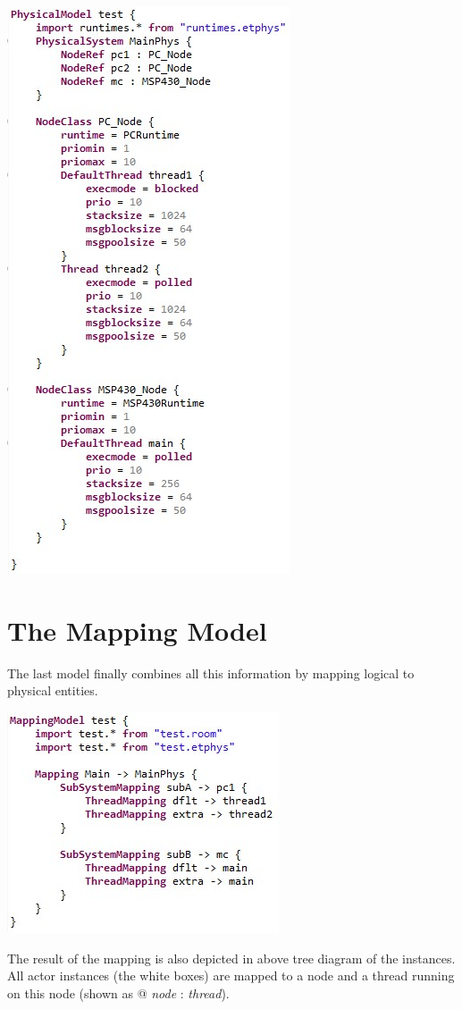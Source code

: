 \includegraphics{images/080-phys.jpg}

\section{The Mapping Model}

The last model finally combines all this information by mapping logical to physical entities.

\includegraphics{images/080-map.jpg}

The result of the mapping is also depicted in above tree diagram of the instances. All actor instances 
(the white boxes) are mapped to a node and a thread running on this node (shown as @ \textit{node} : 
\textit{thread}).
